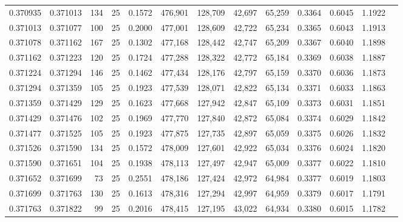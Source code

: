 \begin{tabular}{rrrrrrrrrrrrr}
0.370935 & 0.371013 &   134 &  25 &                                     0.1572 & 476,901 & 128,709 &  42,697 &  65,259 & 0.3364 & 0.6045 & 1.1922 \\
0.371013 & 0.371077 &   100 &  25 &                                     0.2000 & 477,001 & 128,609 &  42,722 &  65,234 & 0.3365 & 0.6043 & 1.1913 \\
0.371078 & 0.371162 &   167 &  25 &                                     0.1302 & 477,168 & 128,442 &  42,747 &  65,209 & 0.3367 & 0.6040 & 1.1898 \\
0.371162 & 0.371223 &   120 &  25 &                                     0.1724 & 477,288 & 128,322 &  42,772 &  65,184 & 0.3369 & 0.6038 & 1.1887 \\
0.371224 & 0.371294 &   146 &  25 &                                     0.1462 & 477,434 & 128,176 &  42,797 &  65,159 & 0.3370 & 0.6036 & 1.1873 \\
0.371294 & 0.371359 &   105 &  25 &                                     0.1923 & 477,539 & 128,071 &  42,822 &  65,134 & 0.3371 & 0.6033 & 1.1863 \\
0.371359 & 0.371429 &   129 &  25 &                                     0.1623 & 477,668 & 127,942 &  42,847 &  65,109 & 0.3373 & 0.6031 & 1.1851 \\
0.371429 & 0.371476 &   102 &  25 &                                     0.1969 & 477,770 & 127,840 &  42,872 &  65,084 & 0.3374 & 0.6029 & 1.1842 \\
0.371477 & 0.371525 &   105 &  25 &                                     0.1923 & 477,875 & 127,735 &  42,897 &  65,059 & 0.3375 & 0.6026 & 1.1832 \\
0.371526 & 0.371590 &   134 &  25 &                                     0.1572 & 478,009 & 127,601 &  42,922 &  65,034 & 0.3376 & 0.6024 & 1.1820 \\
0.371590 & 0.371651 &   104 &  25 &                                     0.1938 & 478,113 & 127,497 &  42,947 &  65,009 & 0.3377 & 0.6022 & 1.1810 \\
0.371652 & 0.371699 &    73 &  25 &                                     0.2551 & 478,186 & 127,424 &  42,972 &  64,984 & 0.3377 & 0.6019 & 1.1803 \\
0.371699 & 0.371763 &   130 &  25 &                                     0.1613 & 478,316 & 127,294 &  42,997 &  64,959 & 0.3379 & 0.6017 & 1.1791 \\
0.371763 & 0.371822 &    99 &  25 &                                     0.2016 & 478,415 & 127,195 &  43,022 &  64,934 & 0.3380 & 0.6015 & 1.1782 \\

\end{tabular}
